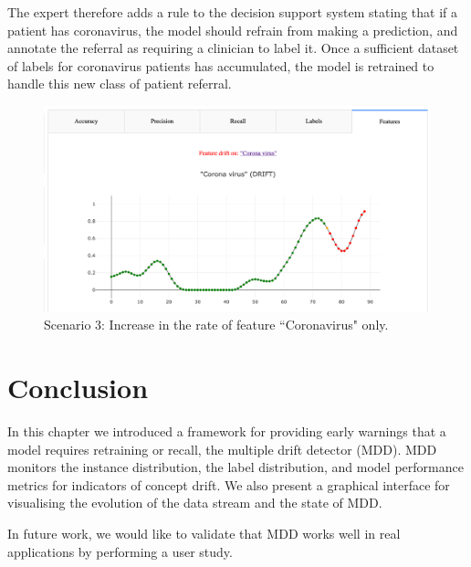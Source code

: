 The expert therefore adds a rule to the decision support system stating that if a patient has coronavirus, the model should refrain from making a prediction, and annotate the referral as requiring a clinician to label it.
Once a sufficient dataset of labels for coronavirus patients has accumulated, the model is retrained to handle this new class of patient referral. 

\begin{figure}
    \centering
    \includegraphics[width=\textwidth]{images/corona_virus.png}
    \caption{Scenario 3: Increase in the rate of feature ``Coronavirus" only.}
    \label{fig:scenario3}
\end{figure}



\section{Conclusion} \label{mdd:conclusion}

In this chapter we introduced a framework for providing early warnings that a model requires retraining or recall, the multiple drift detector (MDD). MDD monitors the instance distribution, the label distribution, and model performance metrics for indicators of concept drift. We also present a graphical interface for visualising the evolution of the data stream and the state of MDD. 

In future work, we would like to validate that MDD works well in real applications by performing a user study.
